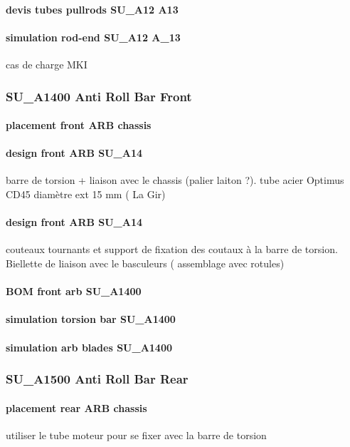 			\paragraph{devis tubes pullrods SU\_A12 A13} 
			\paragraph{simulation rod-end SU\_A12 A\_13} cas de charge MKI
		\subsubsection*{SU\_A1400 Anti Roll Bar Front} 
 \par 
			\paragraph{placement front ARB chassis} 
			\paragraph{design front ARB SU\_A14} barre de torsion + liaison avec le chassis (palier laiton ?). tube acier Optimus CD45 diamètre ext 15 mm ( La Gir)
			\paragraph{design front ARB SU\_A14} couteaux tournants et support de fixation des coutaux à la barre de torsion. Biellette de liaison avec le basculeurs ( assemblage avec rotules)
			\paragraph{BOM front arb SU\_A1400} 
			\paragraph{simulation torsion bar SU\_A1400} 
			\paragraph{simulation arb blades SU\_A1400} 
		\subsubsection*{SU\_A1500 Anti Roll Bar Rear} 
 \par 
			\paragraph{placement rear ARB chassis} utiliser le tube moteur pour se fixer avec la barre de torsion
